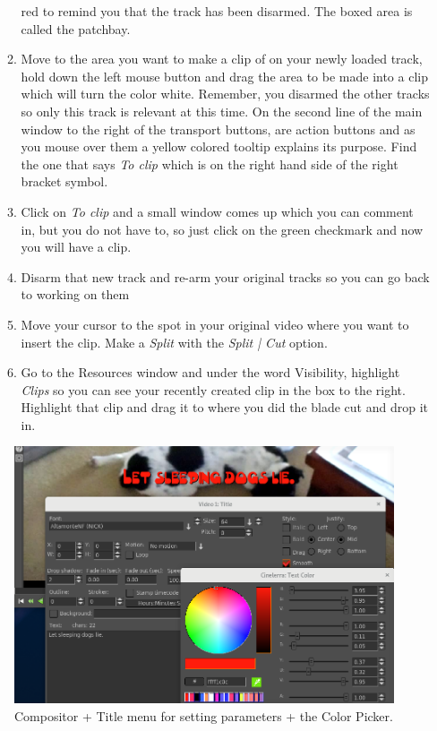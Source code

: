\begin{enumerate}
\begin{enumerate}
		red to remind you that the track has been disarmed.  The boxed area is called the patchbay.
		\item Move to the area you want to make a clip of on your newly loaded track, hold down the left mouse
		button and drag the area to be made into a clip which will turn the color white.  Remember, you
		disarmed the other tracks so only this track is relevant at this time.  On the second line of the main
		window to the right of the transport buttons, are action buttons and as you mouse over them a
		yellow colored tooltip explains its purpose.  Find the one that says \textit{To clip} which is on the right
		hand side of the right bracket symbol.
		\item Click on \textit{To clip} and a small window comes up which you can comment in, but you do not have
		to, so just click on the green checkmark and now you will have a clip.
		\item Disarm that new track and re-arm your original tracks so you can go back to working on them
		\item Move your cursor to the spot in your original video where you want to insert the clip.   Make a
		\textit{Split} with the \textit{Split | Cut} option.
		\item Go to the Resources window and under the word Visibility, highlight \textit{Clips} so you can see your
		recently created clip in the box to the right.  Highlight that clip and drag it to where you did the
		blade cut and drop it in.
	\end{enumerate}
\end{enumerate}

\begin{figure}[htpb]
	\centering
	\includegraphics[width=1.0\linewidth]{images/title_color.png}
	\caption{Compositor + Title menu for setting parameters + the Color Picker.}	
\end{figure}

